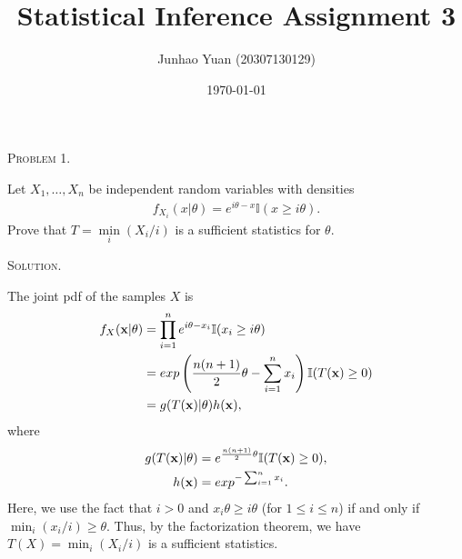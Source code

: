 \documentclass{article}
\title{\textbf{Statistical Inference Assignment 3}}
\author{Junhao Yuan (20307130129)}
\date{\today}
\begin{document}
\begin{CJK}{UTF8}{gbsn}

    \maketitle
    \def \RR{{\mathbb R}}
    \def \EE{{\mathbb E}}
    \def \VV{{\mathbb V}}
    \def \II{{\mathbb I}}

    \newtheorem{lemma}{Lemma}[]

    \begin{shaded}
        \noindent\textsc{Problem 1.}\par
        Let $X_1,\ldots, X_n$ be independent random variables with densities
        \begin{align}
            f_{X_i}(x|\theta) = e^{i\theta - x} \II(x\geq i\theta).
        \end{align}
        Prove that $T=\mathop{min}\limits_{i}(X_i/i)$ is a sufficient statistics for $\theta$.
    \end{shaded}
    \noindent\textsc{Solution.}\par
    The joint pdf of the samples $X$ is
    \begin{align}
        f_X(\mathbf{x}|\theta) & = \prod_{i=1}^n e^{i\theta - x_i} \II(x_i\geq i\theta) \notag                                      \\
                               & = exp \left ({\frac{n(n+1)}{2}\theta - \sum_{i=1}^n x_i} \right ) \II (T(\mathbf{x}) \geq 0)\notag \\
                               & = g(T(\mathbf{x})|\theta) h(\mathbf{x}),\notag
    \end{align}
    where
    \begin{align}
        g(T(\mathbf{x})|\theta) & = e^{{\frac{n(n+1)}{2}\theta}}\II (T(\mathbf{x}) \geq 0),\notag \\
        h(\mathbf{x})           & = exp^{- \sum_{i=1}^n x_i}.\notag
    \end{align}
    Here, we use the fact that $i>0$ and $x_i\theta \geq i\theta$ (for $1\leq i \leq n$) if and only if $\mathop{min}_i (x_i/i) \geq \theta$.
    Thus, by the factorization theorem, we have $T(X)=\mathop{min}_i (X_i/i)$ is a sufficient statistics.




\end{CJK}
\end{document}
